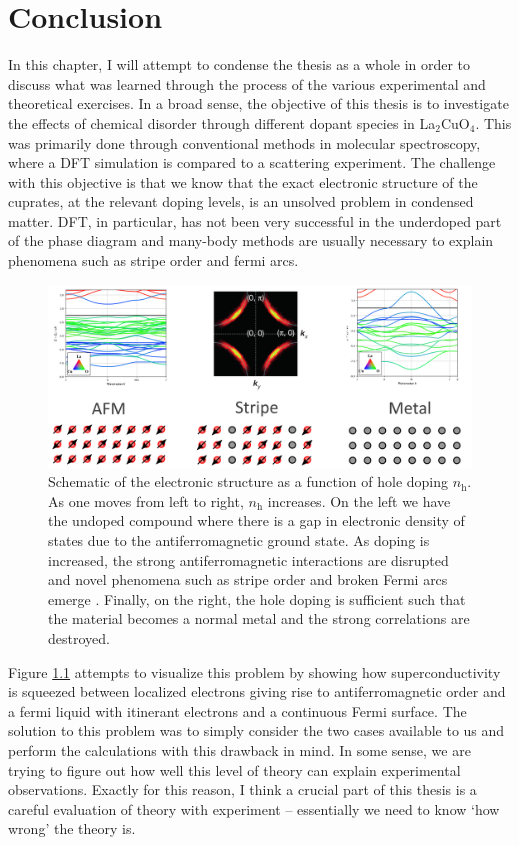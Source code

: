 \chapter{Conclusion}
In this chapter, I will attempt to condense the thesis as a whole in order to discuss what was learned through the process of the various experimental and theoretical exercises. In a broad sense, the objective of this thesis is to investigate the effects of chemical disorder through different dopant species in La$_2$CuO$_4$. This was primarily done through conventional methods in molecular spectroscopy, where a DFT simulation is compared to a scattering experiment. The challenge with this objective is that we know that the exact electronic structure of the cuprates, at the relevant doping levels, is an unsolved problem in condensed matter. DFT, in particular, has not been very successful in the underdoped part of the phase diagram and many-body methods are usually necessary to explain phenomena such as stripe order and fermi arcs.

\begin{figure}
    \centering
    \includegraphics[width=\textwidth]{fig/conclusion/stripe_electronic_structure.png}
    \caption{Schematic of the electronic structure as a function of hole doping $n_\text{h}$. As one moves from left to right, $n_\text{h}$ increases. On the left we have the undoped compound where there is a gap in electronic density of states due to the antiferromagnetic ground state. As doping is increased, the strong antiferromagnetic interactions are disrupted and novel phenomena such as stripe order and broken Fermi arcs emerge \cite{Keimer2015}. Finally, on the right, the hole doping is sufficient such that the material becomes a normal metal and the strong correlations are destroyed.}
    \label{fig:conclusion_stripe_dft}
\end{figure}

Figure \ref{fig:conclusion_stripe_dft} attempts to visualize this problem by showing how superconductivity is squeezed between localized electrons giving rise to antiferromagnetic order and a fermi liquid with itinerant electrons and a continuous Fermi surface. The solution to this problem was to simply consider the two cases available to us and perform the calculations with this drawback in mind. In some sense, we are trying to figure out how well this level of theory can explain experimental observations. Exactly for this reason, I think a crucial part of this thesis is a careful evaluation of theory with experiment -- essentially we need to know `how wrong' the theory is.

